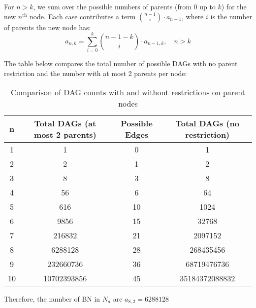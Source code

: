 \documentclass{article}
\begin{document}

For \( n > k \), we sum over the possible numbers of parents (from 0 up to \( k \)) for the new \( n^{\text{th}} \) node. Each case contributes a term \( \binom{n-1}{i} \cdot a_{n-1} \), where \( i \) is the number of parents the new node has:
\[
a_{n,k} = \sum_{i=0}^{k} \binom{n-1-k}{i} \cdot a_{n-1,k}, \quad n > k
\]


The table below compares the total number of possible DAGs with no parent restriction and the number with at most 2 parents per node:

\begin{table}[H]
\centering
\begin{tabular}{|c|c|c|c|}
\hline
\textbf{n} & \textbf{Total DAGs (at most 2 parents)} & \textbf{Possible Edges} & \textbf{Total DAGs (no restriction)} \\ \hline
1          & 1                     & 0                       & 1                  \\ \hline
2          & 2                     & 1                       & 2                  \\ \hline
3          & 8                     & 3                       & 8                  \\ \hline
4          & 56                    & 6                       & 64                 \\ \hline
5          & 616                   & 10                      & 1024               \\ \hline
6          & 9856                  & 15                      & 32768              \\ \hline
7          & 216832                & 21                      & 2097152            \\ \hline
8          & 6288128               & 28                      & 268435456          \\ \hline
9          & 232660736             & 36                      & 68719476736        \\ \hline
10         & 10702393856           & 45                      & 35184372088832     \\ \hline
\end{tabular}
\caption{Comparison of DAG counts with and without restrictions on parent nodes}
\end{table}

Therefore, the number of BN in  $N_a$ are $a_{8,2} = 6288128$
\end{document}
